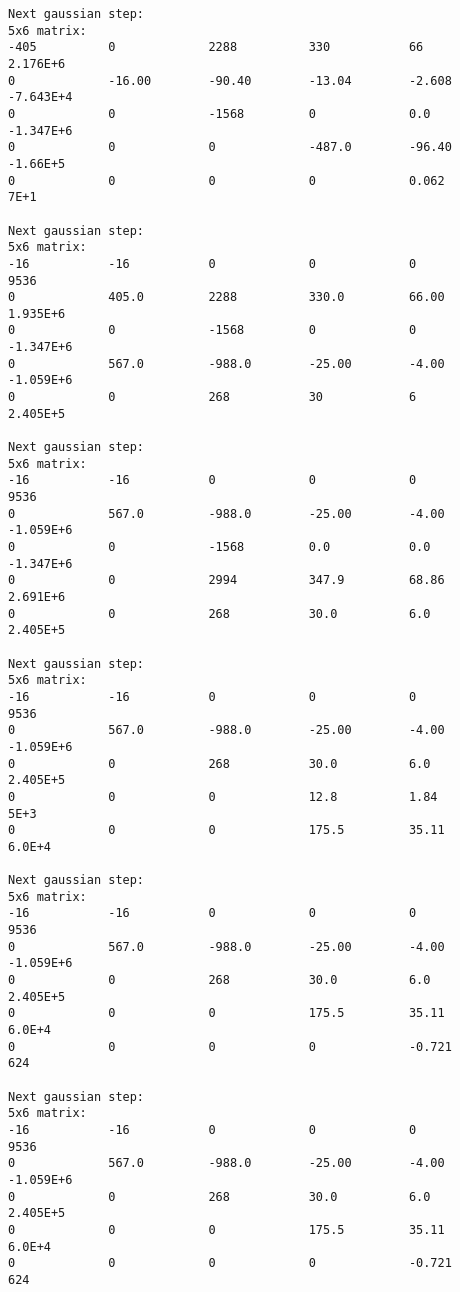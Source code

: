 \documentclass[letterpaper,12pt]{article}
\begin{document}
\begin{verbatim}
Next gaussian step:
5x6 matrix:
-405          0             2288          330           66            2.176E+6      
0             -16.00        -90.40        -13.04        -2.608        -7.643E+4     
0             0             -1568         0             0.0           -1.347E+6     
0             0             0             -487.0        -96.40        -1.66E+5      
0             0             0             0             0.062         7E+1          

Next gaussian step:
5x6 matrix:
-16           -16           0             0             0             9536          
0             405.0         2288          330.0         66.00         1.935E+6      
0             0             -1568         0             0             -1.347E+6     
0             567.0         -988.0        -25.00        -4.00         -1.059E+6     
0             0             268           30            6             2.405E+5      

Next gaussian step:
5x6 matrix:
-16           -16           0             0             0             9536          
0             567.0         -988.0        -25.00        -4.00         -1.059E+6     
0             0             -1568         0.0           0.0           -1.347E+6     
0             0             2994          347.9         68.86         2.691E+6      
0             0             268           30.0          6.0           2.405E+5      

Next gaussian step:
5x6 matrix:
-16           -16           0             0             0             9536          
0             567.0         -988.0        -25.00        -4.00         -1.059E+6     
0             0             268           30.0          6.0           2.405E+5      
0             0             0             12.8          1.84          5E+3          
0             0             0             175.5         35.11         6.0E+4        

Next gaussian step:
5x6 matrix:
-16           -16           0             0             0             9536          
0             567.0         -988.0        -25.00        -4.00         -1.059E+6     
0             0             268           30.0          6.0           2.405E+5      
0             0             0             175.5         35.11         6.0E+4        
0             0             0             0             -0.721        624           

Next gaussian step:
5x6 matrix:
-16           -16           0             0             0             9536          
0             567.0         -988.0        -25.00        -4.00         -1.059E+6     
0             0             268           30.0          6.0           2.405E+5      
0             0             0             175.5         35.11         6.0E+4        
0             0             0             0             -0.721        624           


\end{verbatim}
\end{document}
